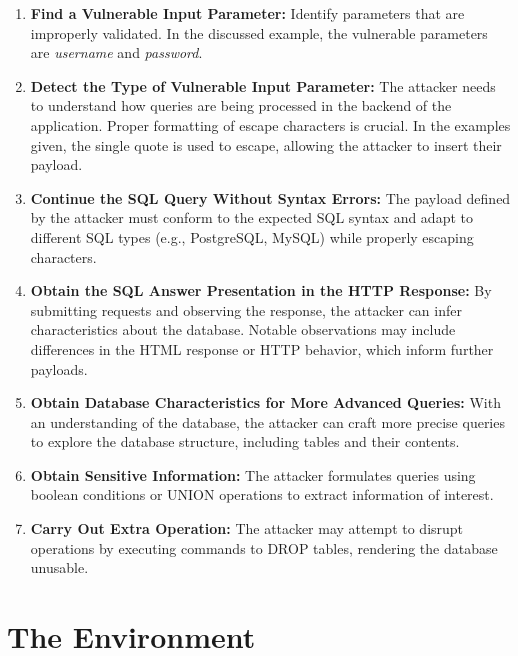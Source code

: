 \documentclass[conference]{IEEEtran}
\begin{document}
\begin{enumerate}
  \item \textbf{Find a Vulnerable Input Parameter:} Identify parameters that are improperly validated. In the discussed example, the vulnerable parameters are \textit{username} and \textit{password}.

  \item \textbf{Detect the Type of Vulnerable Input Parameter:} The attacker needs to understand how queries are being processed in the backend of the application. Proper formatting of escape characters is crucial. In the examples given, the single quote is used to escape, allowing the attacker to insert their payload.

  \item \textbf{Continue the SQL Query Without Syntax Errors:} The payload defined by the attacker must conform to the expected SQL syntax and adapt to different SQL types (e.g., PostgreSQL, MySQL) while properly escaping characters.

  \item \textbf{Obtain the SQL Answer Presentation in the HTTP Response:} By submitting requests and observing the response, the attacker can infer characteristics about the database. Notable observations may include differences in the HTML response or HTTP behavior, which inform further payloads.

  \item \textbf{Obtain Database Characteristics for More Advanced Queries:} With an understanding of the database, the attacker can craft more precise queries to explore the database structure, including tables and their contents.

  \item \textbf{Obtain Sensitive Information:} The attacker formulates queries using boolean conditions or UNION operations to extract information of interest.

  \item \textbf{Carry Out Extra Operation:} The attacker may attempt to disrupt operations by executing commands to DROP tables, rendering the database unusable.
\end{enumerate}

\section{The Environment}
\end{document}
